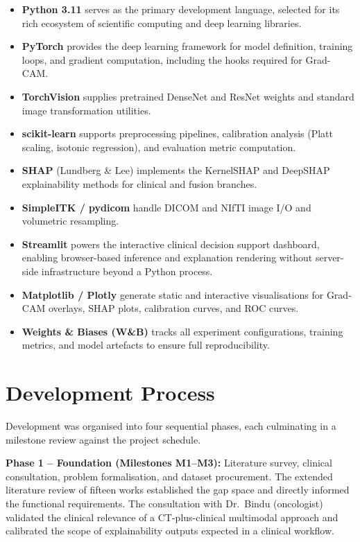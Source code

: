 {\begin{itemize}
    \item \textbf{Python 3.11} serves as the primary development language, selected for its rich ecosystem of scientific computing and deep learning libraries.
    \item \textbf{PyTorch} provides the deep learning framework for model definition, training loops, and gradient computation, including the hooks required for Grad-CAM.
    \item \textbf{TorchVision} supplies pretrained DenseNet and ResNet weights and standard image transformation utilities.
    \item \textbf{scikit-learn} supports preprocessing pipelines, calibration analysis (Platt scaling, isotonic regression), and evaluation metric computation.
    \item \textbf{SHAP} (Lundberg \& Lee) implements the KernelSHAP and DeepSHAP explainability methods for clinical and fusion branches.
    \item \textbf{SimpleITK / pydicom} handle DICOM and NIfTI image I/O and volumetric resampling.
    \item \textbf{Streamlit} powers the interactive clinical decision support dashboard, enabling browser-based inference and explanation rendering without server-side infrastructure beyond a Python process.
    \item \textbf{Matplotlib / Plotly} generate static and interactive visualisations for Grad-CAM overlays, SHAP plots, calibration curves, and ROC curves.
    \item \textbf{Weights \& Biases (W\&B)} tracks all experiment configurations, training metrics, and model artefacts to ensure full reproducibility.
\end{itemize}


\section{Development Process}

Development was organised into four sequential phases, each culminating in a milestone review against the project schedule.

\textbf{Phase 1 -- Foundation (Milestones M1--M3):} Literature survey, clinical consultation, problem formalisation, and dataset procurement. The extended literature review of fifteen works established the gap space and directly informed the functional requirements. The consultation with Dr.\ Bindu (oncologist) validated the clinical relevance of a CT-plus-clinical multimodal approach and calibrated the scope of explainability outputs expected in a clinical workflow.

}
